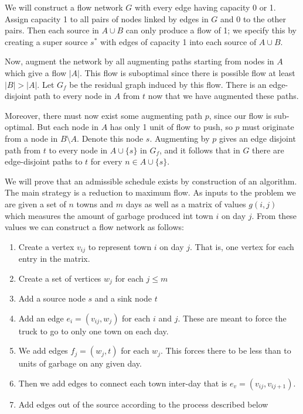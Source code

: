 \documentclass{article}
\newcommand{\problem}[1]{\noindent {\bf #1}}
\begin{document}
\problem{Problem 2.}

We will construct a flow network $G$ with every edge having capacity 0 or 1. Assign capacity 1 to all pairs of nodes linked by edges in $G$ and 0 to the other pairs. Then each source in $A\cup B$ can only produce a flow of 1; we specify this by creating a super source $s^{\ast}$ with edges of capacity 1 into each source of $A\cup B$.

Now, augment the network by all augmenting paths starting from nodes in $A$ which give a flow $|A|$. This flow is suboptimal since there is possible flow at least $|B|>|A|$. Let $G_f$ be the residual graph induced by this flow. There is an edge-disjoint path to every node in $A$ from $t$ now that we have augmented these paths.

Moreover, there must now exist some augmenting path $p$, since our flow is sub-optimal. But each node in $A$ has only 1 unit of flow to push, so $p$ must originate from a node in $B\setminus A$. Denote this node $s$. Augmenting by $p$ gives an edge disjoint path from $t$ to every node in $A\cup\{s\}$ in $G_f$, and it follows that in $G$ there are edge-disjoint paths to $t$ for every $n\in A\cup\{s\}$.

\problem{Problem 3.} 

We will prove that an admissible schedule exists by construction of an algorithm. The main strategy is a reduction to maximum flow. As inputs to the problem we are given a set of $n$ towns and $m$ days as well as a matrix of values $g(i,j)$ which measures the amount of garbage produced int town $i$ on day $j$. From these values we can construct a flow network as follows:
\begin{enumerate}
\item  Create a vertex $v_{ij}$ to represent town $i$ on day $j$. That is, one vertex for each entry in the matrix.
\item Create a set of vertices $w_j$ for each $j \leq m$
\item Add a source node $s$ and a sink node $t$
\item Add an edge $e_i = (v_{ij}, w_j)$ for each $i$ and $j$. These are meant to force the truck to go to only one town on each day.
\item We add edges $f_j = (w_j, t)$ for each $w_j$. This forces there to be less than to units of garbage on any given day. 
\item Then we add edges to connect each town inter-day that is $e_v = (v_{ij}, v_{ij+1})$. 
\item Add edges out of the source according to the process described below
\end{enumerate}
\end{document}
